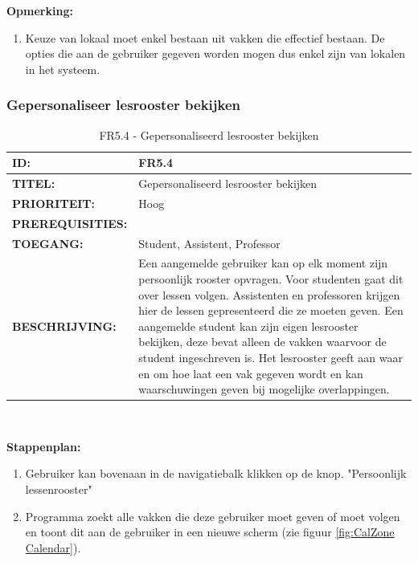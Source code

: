\textbf{Opmerking:}
	\begin{enumerate}
	\item Keuze van lokaal moet enkel bestaan uit vakken die effectief bestaan. De opties die aan de gebruiker gegeven worden mogen dus enkel zijn van lokalen in het systeem.
	\end{enumerate}  

\subsubsection{Gepersonaliseer lesrooster bekijken}
\noindent\begin{table}[H]
            \begin{tabular}{l | p{10cm}}
                \textbf{ID:} & FR5.4 \\ \hline
                \textbf{TITEL:} & Gepersonaliseerd lesrooster bekijken\\ \hline
                \textbf{PRIORITEIT:} &  Hoog \\ \hline
                \textbf{PREREQUISITIES:} & \\ \hline
                \textbf{TOEGANG:} &  Student, Assistent, Professor \\ \hline
                \textbf{BESCHRIJVING:} & Een aangemelde gebruiker kan op elk moment zijn persoonlijk rooster opvragen. Voor studenten gaat dit over lessen volgen. Assistenten en professoren krijgen hier de lessen gepresenteerd die ze moeten geven. Een aangemelde student kan zijn eigen lesrooster bekijken, deze bevat alleen de vakken waarvoor de student ingeschreven is. 
                                        Het lesrooster geeft aan waar en om hoe laat een vak gegeven wordt en kan waarschuwingen geven bij mogelijke overlappingen.\\ 
            \end{tabular}\\
            \caption{FR5.4  - Gepersonaliseerd lesrooster bekijken}
            \label{tab:FR5.4 - Gepersonaliseerd lesrooster bekijken}
        \end{table}

\textbf{Stappenplan:}
	\begin{enumerate}
	\item Gebruiker kan bovenaan in de navigatiebalk klikken op de knop. "Persoonlijk lessenrooster"
	\item Programma zoekt alle vakken die deze gebruiker moet geven of moet volgen en toont dit aan de gebruiker in een nieuwe scherm (zie figuur \ref{fig:CalZone Calendar}).
	\end{enumerate}

